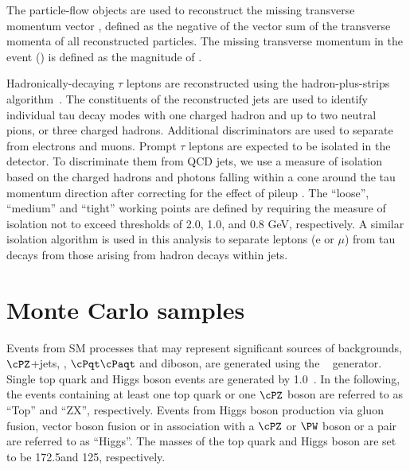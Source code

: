 The particle-flow objects are used to reconstruct the missing transverse momentum  vector \ptvecmiss, defined as the negative of the vector sum of the transverse momenta of all reconstructed particles.  
The missing transverse momentum in the event (\MPT) is defined as the magnitude of \ptvecmiss.

Hadronically-decaying $\tau$ leptons are reconstructed using the hadron-plus-strips algorithm~\cite{Khachatryan:2015dfa}.
The constituents of the reconstructed jets are used to identify individual tau decay modes with one charged 
hadron and up to two neutral pions, or three charged hadrons. 
Additional discriminators are used to separate \Tau from electrons and muons.
Prompt $\tau$ leptons are expected to be isolated in the detector.
To discriminate them from QCD jets, we use a measure of isolation 
based on the charged hadrons and photons falling within 
a cone around the tau momentum direction after correcting for the effect of
pileup \cite{Khachatryan:2014wca}. The ``loose'', ``medium'' and ``tight'' working points are defined
by requiring the measure of isolation not to exceed thresholds of 2.0, 1.0,
and 0.8 GeV, respectively.
 A similar isolation algorithm is 
used in this analysis to separate leptons (e or $\mu$) from tau decays from 
those arising from hadron decays within jets.

\section{Monte Carlo samples}
\label{sect:MCSamples}
Events from SM processes that may represent significant sources of backgrounds, $\cPZ$+jets, \wjets, $\cPqt\cPaqt$ and diboson, 
are generated using the ~\cite{Alwall:2011uj} generator. 
Single top quark and Higgs boson events are generated by {\POWHEG} 1.0~\cite{Nason:2004rx,Frixione:2007vw,Alioli:2009je,Alioli:2010xd}.
In the following, the events containing at least one top quark or one $\cPZ$ boson are referred to as ``Top'' and ``ZX'', respectively. 
Events from Higgs boson production via gluon fusion, vector boson fusion or in association with a $\cPZ$ or $\PW$ boson or a \ttbar pair are referred to as ``Higgs''. The masses of the top quark and Higgs boson are set to be 172.5\GeV and 125\GeV, respectively.

